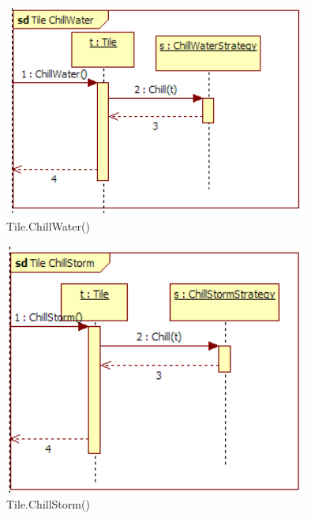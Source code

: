 \begin{figure}[H]
	\begin{center}
		\includegraphics[width=10cm]{chapters/chapter04/seqdiag/Tile_ChillWater.png}
		\caption{Tile.ChillWater()}
		\label{fig:TileChillWater}
	\end{center}
\end{figure}
\begin{figure}[H]
	\begin{center}
		\includegraphics[width=10cm]{chapters/chapter04/seqdiag/Tile_ChillStorm.png}
		\caption{Tile.ChillStorm()}
		\label{fig:TileChillStorm}
	\end{center}
\end{figure}
